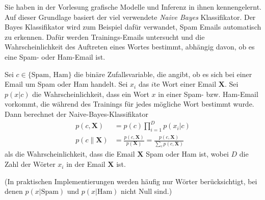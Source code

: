 

\renewcommand{\course}{Artificial Intelligence}
\renewcommand{\coursepicture}{course_ai}
\renewcommand{\coursedate}{Winter 2019}
\renewcommand{\exnum}{6}

\exercises



Sie haben in der Vorlesung grafische Modelle und Inferenz in ihnen
kennengelernt. Auf dieser Grundlage basiert der viel verwendete \emph{Naive
Bayes} Klassifikator. Der Bayes Klassifikator wird zum Beispiel dafür verwandet,
Spam Emails automatisch zu erkennen. Dafür werden Trainings-Emails untersucht
und die Wahrscheinlichkeit des Auftreten eines Wortes bestimmt, abhängig davon, ob es eine Spam- oder Ham-Email ist.

Sei $c \in \{\text{Spam, Ham}\}$ die binäre Zufallsvariable, die angibt, ob es sich bei einer Email um Spam oder Ham handelt. Sei $x_i$ das $i$te Wort einer Email $\mathbf{X}$. Sei $p(x|c)$ die Wahrscheinlichkeit, dass ein Wort $x$ in einer Spam- bzw. Ham-Email vorkommt, die während des Trainings für jedes mögliche Wort bestimmt wurde. Dann berechnet der Naive-Bayes-Klassifikator
\begin{align*}
  p(c, \mathbf{X}) &= p(c) \prod_{i=1}^{D} p(x_i | c) \\
  p(c \| \mathbf{X}) &= \frac{p(c, \mathbf{X})}{p(\mathbf{X})}
  = \frac{p(c, \mathbf{X})}{\sum_c p(c,\mathbf{X})}
\end{align*}
als die Wahrscheinlichkeit, dass die Email $\mathbf{X}$ Spam oder Ham ist, wobei $D$ die Zahl der Wörter $x_i$ in der Email $\mathbf{X}$ ist.

(In praktischen Implementierungen werden häufig nur Wörter
berücksichtigt, bei denen $p(x|\text{Spam})$ und $p(x|\text{Ham})$
nicht Null sind.)



